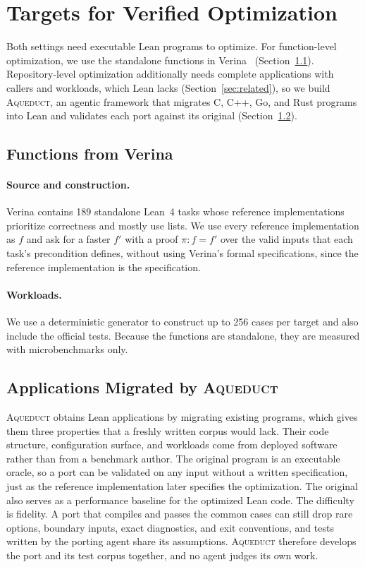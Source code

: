 \documentclass{article}
\newcommand{\aqueduct}{\textsc{Aqueduct}\xspace}
\newcommand{\verina}{Verina\xspace}
\begin{document}
\section{Targets for Verified Optimization}
\label{sec:testbeds}

Both settings need executable Lean programs to optimize.
For function-level optimization, we use the standalone functions in \verina{}~\citep{ye2026verina} (Section~\ref{sec:verina-opt}).
Repository-level optimization additionally needs complete applications with callers and workloads, which Lean lacks (Section~\ref{sec:related}), so we build \aqueduct{}, an agentic framework that migrates C, C++, Go, and Rust programs into Lean and validates each port against its original (Section~\ref{sec:aqueduct}).

\subsection{Functions from \verina{}}
\label{sec:verina-opt}

\paragraph{Source and construction.}
\verina{} contains 189 standalone Lean~4 tasks whose reference implementations prioritize correctness and mostly use lists.
We use every reference implementation as $f$ and ask for a faster $f'$ with a proof $\pi : f=f'$ over the valid inputs that each task's precondition defines, without using \verina{}'s formal specifications, since the reference implementation is the specification.

\paragraph{Workloads.}
We use a deterministic generator to construct up to 256 cases per target and also include the official tests.
Because the functions are standalone, they are measured with microbenchmarks only.

\subsection{Applications Migrated by \aqueduct{}}
\label{sec:aqueduct}

\aqueduct{} obtains Lean applications by migrating existing programs, which gives them three properties that a freshly written corpus would lack.
Their code structure, configuration surface, and workloads come from deployed software rather than from a benchmark author.
The original program is an executable oracle, so a port can be validated on any input without a written specification, just as the reference implementation later specifies the optimization.
The original also serves as a performance baseline for the optimized Lean code.
The difficulty is fidelity.
A port that compiles and passes the common cases can still drop rare options, boundary inputs, exact diagnostics, and exit conventions, and tests written by the porting agent share its assumptions.
\aqueduct{} therefore develops the port and its test corpus together, and no agent judges its own work.
\end{document}

